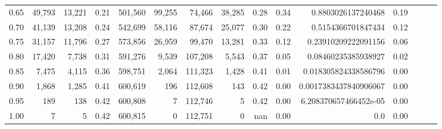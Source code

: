 \begin{tabular}{rrrrrrrrrrrrrrr}
0.65 &  49,793 &  13,221 &  0.21 &  501,560 &   99,255 &   74,466 &   38,285 &  0.28 &  0.34 &     0.8803026137240468 &      0.19 \\
0.70 &  41,139 &  13,208 &  0.24 &  542,699 &   58,116 &   87,674 &   25,077 &  0.30 &  0.22 &     0.5154366701847434 &      0.12 \\
0.75 &  31,157 &  11,796 &  0.27 &  573,856 &   26,959 &   99,470 &   13,281 &  0.33 &  0.12 &    0.23910209222091156 &      0.06 \\
0.80 &  17,420 &   7,738 &  0.31 &  591,276 &    9,539 &  107,208 &    5,543 &  0.37 &  0.05 &    0.08460235385938927 &      0.02 \\
0.85 &   7,475 &   4,115 &  0.36 &  598,751 &    2,064 &  111,323 &    1,428 &  0.41 &  0.01 &   0.018305824338586796 &      0.00 \\
0.90 &   1,868 &   1,285 &  0.41 &  600,619 &      196 &  112,608 &      143 &  0.42 &  0.00 &  0.0017383437840906067 &      0.00 \\
0.95 &     189 &     138 &  0.42 &  600,808 &        7 &  112,746 &        5 &  0.42 &  0.00 &  6.208370657466452e-05 &      0.00 \\
1.00 &       7 &       5 &  0.42 &  600,815 &        0 &  112,751 &        0 &   nan &  0.00 &                    0.0 &      0.00 \\
\bottomrule
\end{tabular}
